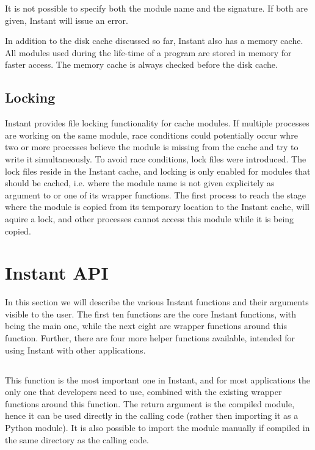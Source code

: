 It is not possible to specify both the module name and the signature. If both
are given, Instant will issue an error.

In addition to the disk cache discussed so far, Instant also has a memory
cache. All modules used during the life-time of a program are stored in
memory for faster access. The memory cache is always checked before the disk
cache.

\subsection{Locking}
Instant provides file locking functionality for cache modules. If multiple
processes are working on the same module, race conditions could potentially
occur whre two or more processes believe the module is missing from the cache
and try to write it simultaneously. To avoid race conditions, lock files were
introduced. The lock files reside in the Instant cache, and locking is only
enabled for modules that should be cached, i.e. where the module name is not
given explicitely as argument to  or one of its wrapper
functions. The first process to reach the stage where the module is copied
from its temporary location to the Instant cache, will aquire a lock, and
other processes cannot access this module while it is being copied.



\section{Instant API}
\label{sec:api}
In this section we will describe the various Instant functions and their
arguments visible to the user. The first ten functions are the core Instant
functions, with  being the main one, while the next eight
are wrapper functions around this function. Further, there are four more
helper functions available, intended for using Instant with other
applications.


\subsection[build\_module]{}
This function is the most important one in Instant, and for most applications
the only one that developers need to use, combined with the existing wrapper
functions around this function. The return argument is the compiled module,
hence it can be used directly in the calling code (rather then importing it as
a Python module). It is also possible to import the
module manually if compiled in the same directory as the calling code.

